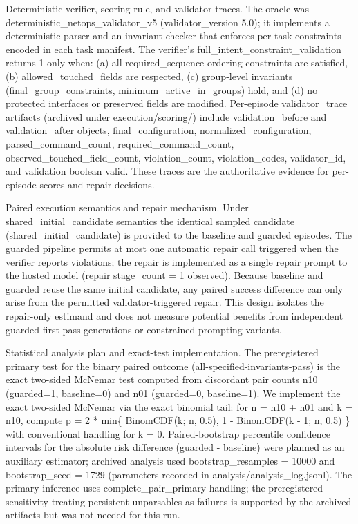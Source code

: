 \documentclass[conference]{IEEEtran}
\begin{document}
Deterministic verifier, scoring rule, and validator traces. The oracle was deterministic\_netops\_validator\_v5 (validator\_version 5.0); it implements a deterministic parser and an invariant checker that enforces per-task constraints encoded in each task manifest. The verifier's full\_intent\_constraint\_validation returns 1 only when: (a) all required\_sequence ordering constraints are satisfied, (b) allowed\_touched\_fields are respected, (c) group-level invariants (final\_group\_constraints, minimum\_active\_in\_groups) hold, and (d) no protected interfaces or preserved fields are modified. Per-episode validator\_trace artifacts (archived under execution/scoring/) include validation\_before and validation\_after objects, final\_configuration, normalized\_configuration, parsed\_command\_count, required\_command\_count, observed\_touched\_field\_count, violation\_count, violation\_codes, validator\_id, and validation boolean valid. These traces are the authoritative evidence for per-episode scores and repair decisions.

Paired execution semantics and repair mechanism. Under shared\_initial\_candidate semantics the identical sampled candidate (shared\_initial\_candidate) is provided to the baseline and guarded episodes. The guarded pipeline permits at most one automatic repair call triggered when the verifier reports violations; the repair is implemented as a single repair prompt to the hosted model (repair stage\_count = 1 observed). Because baseline and guarded reuse the same initial candidate, any paired success difference can only arise from the permitted validator-triggered repair. This design isolates the repair-only estimand and does not measure potential benefits from independent guarded-first-pass generations or constrained prompting variants.

Statistical analysis plan and exact-test implementation. The preregistered primary test for the binary paired outcome (all-specified-invariants-pass) is the exact two-sided McNemar test computed from discordant pair counts n10 (guarded=1, baseline=0) and n01 (guarded=0, baseline=1). We implement the exact two-sided McNemar via the exact binomial tail: for n = n10 + n01 and k = n10, compute p = 2 * min\{ BinomCDF(k; n, 0.5), 1 - BinomCDF(k - 1; n, 0.5) \} with conventional handling for k = 0. Paired-bootstrap percentile confidence intervals for the absolute risk difference (guarded - baseline) were planned as an auxiliary estimator; archived analysis used bootstrap\_resamples = 10000 and bootstrap\_seed = 1729 (parameters recorded in analysis/analysis\_log.jsonl). The primary inference uses complete\_pair\_primary handling; the preregistered sensitivity treating persistent unparsables as failures is supported by the archived artifacts but was not needed for this run.
\end{document}
